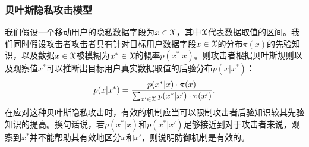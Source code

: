 \subsubsection{贝叶斯隐私攻击模型} 
我们假设一个移动用户的隐私数据字段为$x\in\mathcal{X}$，其中$\mathcal{X}$代表数据取值的区间。我们同时假设攻击者攻击者具有针对目标用户数据字段$x\in\mathcal{X}$的分布$\pi(x)$的{\kaishu 先验}知识，以及数据$x\in\mathcal{X}$被模糊为$x^*\in\mathcal{X}$的概率$p(x^*|x)$。则攻击者根据贝叶斯规则以及观察值$x^*$可以推断出目标用户真实数据取值的{\kaishu 后验}分布$p(x|x^*)$：
\begin{equation}
p(x|x^*)=\frac{p(x^*|x)\cdot\pi(x)}{\sum_{x'\in\mathcal{X}}p(x^*|x')\cdot\pi(x')}.
\end{equation}
在应对这种贝叶斯隐私攻击时，有效的机制应当可以限制攻击者后验知识较其先验知识的提高。换句话说，若$p(x^*|x)$和$p(x^*|x')$足够接近到对于攻击者来说，观察到$x^*$并不能帮助其有效地区分$x$和$x'$，则说明防御机制是有效的。

